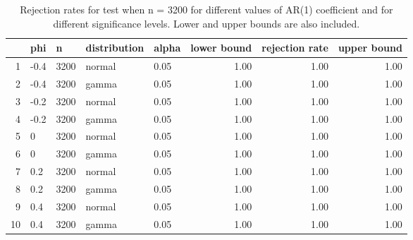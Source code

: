 \begin{table}[ht]
\centering
\caption{Rejection rates for test when n = 3200 for 
                   different values of AR(1) coefficient and for different 
                   significance levels. Lower and upper bounds are also 
                   included.} 
\label{table:rr_3200}
\begin{tabular}{rllllrrr}
  \hline
 & phi & n & distribution & alpha & lower bound & rejection rate & upper bound \\ 
  \hline
1 & -0.4 & 3200 & normal & 0.05 & 1.00 & 1.00 & 1.00 \\ 
  2 & -0.4 & 3200 & gamma & 0.05 & 1.00 & 1.00 & 1.00 \\ 
  3 & -0.2 & 3200 & normal & 0.05 & 1.00 & 1.00 & 1.00 \\ 
  4 & -0.2 & 3200 & gamma & 0.05 & 1.00 & 1.00 & 1.00 \\ 
  5 & 0 & 3200 & normal & 0.05 & 1.00 & 1.00 & 1.00 \\ 
  6 & 0 & 3200 & gamma & 0.05 & 1.00 & 1.00 & 1.00 \\ 
  7 & 0.2 & 3200 & normal & 0.05 & 1.00 & 1.00 & 1.00 \\ 
  8 & 0.2 & 3200 & gamma & 0.05 & 1.00 & 1.00 & 1.00 \\ 
  9 & 0.4 & 3200 & normal & 0.05 & 1.00 & 1.00 & 1.00 \\ 
  10 & 0.4 & 3200 & gamma & 0.05 & 1.00 & 1.00 & 1.00 \\ 
   \hline
\end{tabular}
\end{table}

